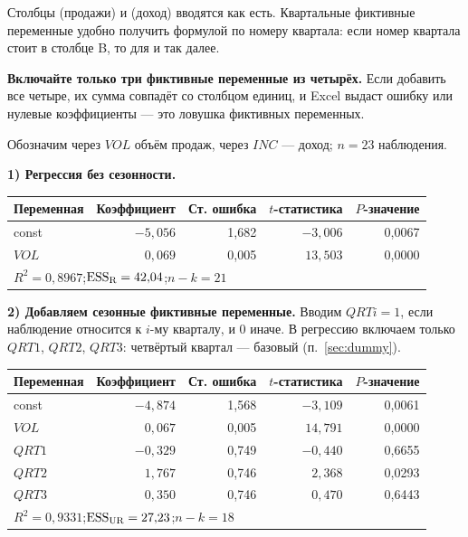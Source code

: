 \begin{excel}
Столбцы  (продажи) и  (доход) вводятся как есть. Квартальные
фиктивные переменные удобно получить формулой по номеру квартала: если номер
квартала стоит в столбце B, то  для  и так далее.

\smallskip
\textbf{Включайте только три фиктивные переменные из четырёх.} Если добавить все
четыре, их сумма совпадёт со столбцом единиц, и Excel выдаст ошибку или нулевые
коэффициенты — это ловушка фиктивных переменных.
\end{excel}

\ifsolutions\clearpage\fi
\begin{solution}
Обозначим через $\mathit{VOL}$ объём продаж, через $\mathit{INC}$ — доход;
$n = 23$ наблюдения.

\medskip
\textbf{1) Регрессия без сезонности.}
\begin{center}
\begin{tabular}{lrrrr}
\toprule
Переменная & Коэффициент & Ст. ошибка & $t$-статистика & $P$-значение \\
\midrule
const          & $-5{,}056$ & 1,682 & $-3{,}006$ & 0,0067 \\
$\mathit{VOL}$ & $\phantom{-}0{,}069$ & 0,005 & $13{,}503$ & 0,0000 \\
\midrule
\multicolumn{5}{l}{$R^2 = 0{,}8967$;\quad $\mathrm{ESS}_{\mathrm{R}} = 42{,}04$;\quad $n - k = 21$} \\
\bottomrule
\end{tabular}
\end{center}

\medskip
\textbf{2) Добавляем сезонные фиктивные переменные.} Вводим $\mathit{QRT}i = 1$,
если наблюдение относится к $i$-му кварталу, и 0 иначе. В регрессию включаем
только $\mathit{QRT}1$, $\mathit{QRT}2$, $\mathit{QRT}3$: четвёртый квартал —
базовый (п.~\ref{sec:dummy}).
\begin{center}
\begin{tabular}{lrrrr}
\toprule
Переменная & Коэффициент & Ст. ошибка & $t$-статистика & $P$-значение \\
\midrule
const             & $-4{,}874$ & 1,568 & $-3{,}109$ & 0,0061 \\
$\mathit{VOL}$    & $\phantom{-}0{,}067$ & 0,005 & $14{,}791$ & 0,0000 \\
$\mathit{QRT}1$   & $-0{,}329$ & 0,749 & $-0{,}440$ & 0,6655 \\
$\mathit{QRT}2$   & $\phantom{-}1{,}767$ & 0,746 & $\phantom{-}2{,}368$ & 0,0293 \\
$\mathit{QRT}3$   & $\phantom{-}0{,}350$ & 0,746 & $\phantom{-}0{,}470$ & 0,6443 \\
\midrule
\multicolumn{5}{l}{$R^2 = 0{,}9331$;\quad $\mathrm{ESS}_{\mathrm{UR}} = 27{,}23$;\quad $n - k = 18$} \\
\bottomrule
\end{tabular}
\end{center}


\end{solution}
